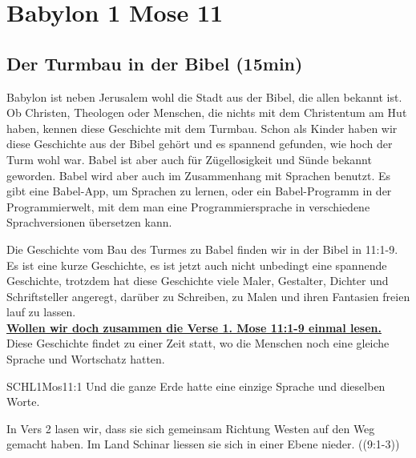 \documentclass[14pt]{../../inc/mybib}
\author{Lothar Schmid}
\begin{document}
\setlength{\baselineskip}{1.5\baselineskip}
\section{Babylon 1 Mose 11}

\subsection{Der Turmbau in der Bibel (15min)}        
    Babylon ist neben Jerusalem wohl die Stadt aus der Bibel, die allen bekannt ist. Ob Christen, Theologen oder Menschen, die nichts mit dem Christentum am Hut haben, kennen diese Geschichte mit dem Turmbau. Schon als Kinder haben wir diese Geschichte aus der Bibel gehört und es spannend gefunden, wie hoch der Turm wohl war. Babel ist aber auch für Zügellosigkeit und Sünde bekannt geworden. Babel wird aber auch im Zusammenhang mit Sprachen benutzt. Es gibt eine Babel-App, um Sprachen zu lernen, oder ein Babel-Programm in der Programmierwelt, mit dem man eine Programmiersprache in verschiedene Sprachversionen übersetzen kann.
    
    Die Geschichte vom Bau des Turmes zu Babel finden wir in der Bibel in  {11:1-9}. Es ist eine kurze Geschichte, es ist jetzt auch nicht unbedingt eine spannende Geschichte, trotzdem hat diese Geschichte viele Maler, Gestalter, Dichter und Schriftsteller angeregt, darüber zu Schreiben, zu Malen und ihren Fantasien freien lauf zu lassen. 
    \\
    \underline{\textbf{Wollen wir doch zusammen die Verse 1. Mose 11:1-9 einmal lesen.}}
    \\
    Diese Geschichte findet zu einer Zeit statt, wo die Menschen noch eine gleiche Sprache und Wortschatz hatten.
    \begin{bibelbox}{SCHL}{1Mos}{11:1}
        Und die ganze Erde hatte eine einzige Sprache und dieselben Worte.
    \end{bibelbox}
    
    In Vers 2 lasen wir, dass sie sich gemeinsam Richtung Westen auf den Weg gemacht haben. Im Land Schinar liessen sie sich in einer Ebene nieder.  ((9:1-3))
\end{document}
